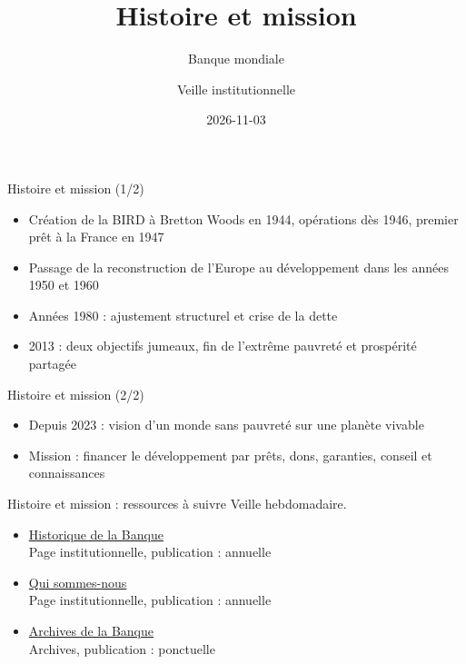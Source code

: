 \documentclass[aspectratio=169,11pt]{beamer}
\title{Histoire et mission}
\subtitle{Banque mondiale}
\author{Veille institutionnelle}
\date{2026-11-03}
\begin{document}
\begin{frame}\titlepage\end{frame}

\begin{frame}{Histoire et mission (1/2)}
\begin{itemize}
\item Création de la BIRD à Bretton Woods en 1944, opérations dès 1946, premier prêt à la France en 1947
\item Passage de la reconstruction de l'Europe au développement dans les années 1950 et 1960
\item Années 1980 : ajustement structurel et crise de la dette
\item 2013 : deux objectifs jumeaux, fin de l'extrême pauvreté et prospérité partagée
\end{itemize}
\end{frame}

\begin{frame}{Histoire et mission (2/2)}
\begin{itemize}
\item Depuis 2023 : vision d'un monde sans pauvreté sur une planète vivable
\item Mission : financer le développement par prêts, dons, garanties, conseil et connaissances
\end{itemize}
\end{frame}

\begin{frame}{Histoire et mission : ressources à suivre}
\small
Veille hebdomadaire.
\begin{itemize}
\item \href{https://www.worldbank.org/en/about/history}{Historique de la Banque}\\{\footnotesize Page institutionnelle, publication : annuelle}
\item \href{https://www.worldbank.org/en/who-we-are}{Qui sommes-nous}\\{\footnotesize Page institutionnelle, publication : annuelle}
\item \href{https://www.worldbank.org/en/about/archives}{Archives de la Banque}\\{\footnotesize Archives, publication : ponctuelle}
\end{itemize}
\end{frame}
\end{document}
